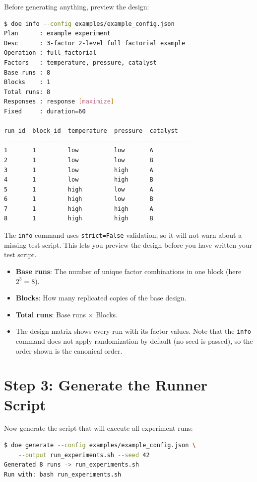 \documentclass[11pt]{book}
\begin{document}
Before generating anything, preview the design:

\begin{lstlisting}[language=bash]
$ doe info --config examples/example_config.json
Plan      : example experiment
Desc      : 3-factor 2-level full factorial example
Operation : full_factorial
Factors   : temperature, pressure, catalyst
Base runs : 8
Blocks    : 1
Total runs: 8
Responses : response [maximize]
Fixed     : duration=60

run_id  block_id  temperature  pressure  catalyst
------------------------------------------------------
1       1         low          low       A
2       1         low          low       B
3       1         low          high      A
4       1         low          high      B
5       1         high         low       A
6       1         high         low       B
7       1         high         high      A
8       1         high         high      B
\end{lstlisting}

The \texttt{info} command uses \texttt{strict=False} validation, so it will not warn about a missing test script. This lets you preview the design before you have written your test script.

\begin{keypoint}
\begin{itemize}[nosep]
  \item \textbf{Base runs}: The number of unique factor combinations in one block (here $2^3 = 8$).
  \item \textbf{Blocks}: How many replicated copies of the base design.
  \item \textbf{Total runs}: Base runs $\times$ Blocks.
  \item The design matrix shows every run with its factor values. Note that the \texttt{info} command does not apply randomization by default (no seed is passed), so the order shown is the canonical order.
\end{itemize}
\end{keypoint}

\section{Step 3: Generate the Runner Script}

Now generate the script that will execute all experiment runs:

\begin{lstlisting}[language=bash]
$ doe generate --config examples/example_config.json \
    --output run_experiments.sh --seed 42
Generated 8 runs -> run_experiments.sh
Run with: bash run_experiments.sh
\end{lstlisting}
\end{document}
